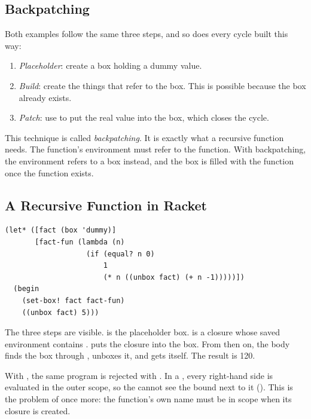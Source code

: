 \subsection{Backpatching}

Both examples follow the same three steps, and so does every cycle built this way:
\begin{enumerate}
  \item \emph{Placeholder}: create a box holding a dummy value.
  \item \emph{Build}: create the things that refer to the box. This is possible because the box already exists.
  \item \emph{Patch}: use  to put the real value into the box, which closes the cycle.
\end{enumerate}
This technique is called \emph{backpatching}. It is exactly what a recursive function needs. The function's environment must refer to the function. With backpatching, the environment refers to a box instead, and the box is filled with the function once the function exists.

\subsection{A Recursive Function in Racket}

\begin{lstlisting}
(let* ([fact (box 'dummy)]
       [fact-fun (lambda (n)
                   (if (equal? n 0)
                       1
                       (* n ((unbox fact) (+ n -1)))))])
  (begin
    (set-box! fact fact-fun)
    ((unbox fact) 5)))
\end{lstlisting}
The three steps are visible.  is the placeholder box.  is a closure whose saved environment contains .  puts the closure into the box. From then on, the body finds the box through , unboxes it, and gets  itself. The result is 120.

\begin{pitfall}
With , the same program is rejected with . In a , every right-hand side is evaluated in the outer scope, so the  cannot see the  bound next to it (). This is the problem of  once more: the function's own name must be in scope when its closure is created.
\end{pitfall}

